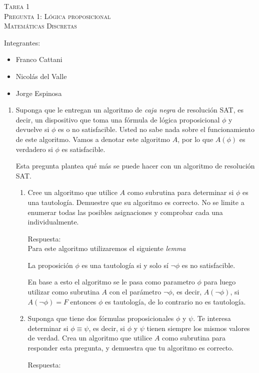 \documentclass{article}
\begin{document}
\begin{center}
    {\Large\textsc{Tarea 1}}\\
    {\small\textsc{Pregunta 1: Lógica proposicional}}\\
    \small{\textsc{Matemáticas Discretas}}
\end{center}

Integrantes:
\begin{itemize}
    \item Franco Cattani
    \item Nicolás del Valle
    \item Jorge Espinosa
\end{itemize}

\begin{enumerate}
    \item Suponga que le entregan un algoritmo de \textit{caja negra}
    de resolución SAT, es decir, un dispositivo que toma una fórmula de 
    lógica proposicional $\phi$ y devuelve si $\phi$ es o no satisfacible.
    Usted no sabe nada sobre el funcionamiento de este algoritmo. Vamos a 
    denotar este algoritmo $A$, por lo que $A(\phi)$ es verdadero si $\phi$
    es satisfacible.

    Esta pregunta plantea qué más se puede hacer con un algoritmo de 
    resolución SAT.
    \begin{enumerate}
        \item Cree un algoritmo que utilice $A$ como subrutina para determinar 
         si $\phi$ es una tautología. Demuestre que su algoritmo es correcto. 
         No se limite a enumerar todas las posibles asignaciones y comprobar cada una individualmente.

        Respuesta: \\ 
            Para este algoritmo utilizaremos el siguiente \textit{lemma}

        \begin{tcolorbox}[title=\textit{Lemma}]
            La proposición $\phi$ es una tautología si y solo sí $\neg\phi$ es no 
            satisfacible.
        \end{tcolorbox}
         
        En base a esto el algoritmo se le pasa como parametro $\phi$ para luego utilizar como subrutina 
        $A$ con el parámetro $\neg\phi$, es decir, $A(\neg\phi)$, si $A(\neg\phi)=F$ entonces $\phi$
         es tautología, de lo contrario no es tautología.

         \item Suponga que tiene dos fórmulas proposicionales $\phi$ y $\psi$. Te interesa determinar 
         si $\phi \equiv \psi$, es decir, si $\phi$ y $\psi$ tienen siempre los mismos valores de verdad.
        Crea un algoritmo que utilice $A$ como subrutina para responder esta pregunta, y demuestra que tu 
        algoritmo es correcto.
        
        Respuesta:

        
    \end{enumerate}
\end{enumerate}
\end{document}
